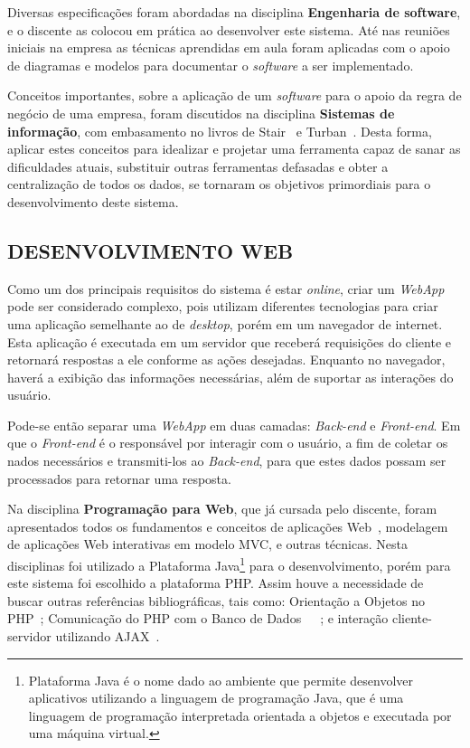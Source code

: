 \documentclass[
  12pt,				%
  openany,
  oneside,
  a4paper,			%
  english,			%
  brazil
]{article}
\numberwithin{figure}{section}
\numberwithin{table}{section}
\begin{document}
Diversas especificações foram abordadas na disciplina \textbf{Engenharia de software}, e o discente as colocou em prática ao desenvolver este sistema. Até nas reuniões iniciais na empresa as técnicas aprendidas em aula foram aplicadas com o apoio de diagramas e modelos para documentar o \textit{software} a ser implementado.

Conceitos importantes, sobre a aplicação de um \textit{software} para o apoio da regra de negócio de uma empresa, foram discutidos na disciplina \textbf{Sistemas de informação}, com embasamento no livros de Stair~\cite{SI_principios} e Turban~\cite{SI_turban}. Desta forma, aplicar estes conceitos para idealizar e projetar uma ferramenta capaz de sanar as dificuldades atuais, substituir outras ferramentas defasadas e obter a centralização de todos os dados, se tornaram os objetivos primordiais para o desenvolvimento deste sistema.

\subsection{DESENVOLVIMENTO WEB}
Como um dos principais requisitos do sistema é estar \textit{online}, criar um \textit{WebApp} pode ser considerado complexo, pois utilizam diferentes tecnologias para criar uma aplicação semelhante ao de \textit{desktop}, porém em um navegador de internet. Esta aplicação é executada em um servidor que receberá requisições do cliente e retornará respostas a ele conforme as ações desejadas. Enquanto no navegador, haverá a exibição das informações necessárias, além de suportar as interações do usuário. 

Pode-se então separar uma \textit{WebApp} em duas camadas: \textit{Back-end} e \textit{Front-end}. Em que o \textit{Front-end} é o responsável por interagir com o usuário, a fim de coletar os nados necessários e transmiti-los ao \textit{Back-end}, para que estes dados possam ser processados para retornar uma resposta.

Na disciplina \textbf{Programação para Web}, que já cursada pelo discente, foram apresentados todos os fundamentos e conceitos de aplicações Web~\cite{pWeb_sebesta}, modelagem de aplicações Web interativas em modelo MVC, e outras técnicas. Nesta disciplinas foi utilizado a Plataforma Java\footnote{Plataforma Java é o nome dado ao ambiente que permite desenvolver aplicativos utilizando a linguagem de programação Java, que é uma linguagem de programação interpretada orientada a objetos e executada por uma máquina virtual.} para o desenvolvimento, porém para este sistema foi escolhido a plataforma PHP. Assim houve a necessidade de buscar outras referências bibliográficas, tais como: Orientação a Objetos no PHP~\cite{PHP_Novatec_poo}; Comunicação do PHP com o Banco de Dados~\cite{PHP_Novatec_dev}~\cite{PHP_Novatec_appWeb}~\cite{PHP_mysql}; e interação cliente-servidor utilizando AJAX~\cite{PHP_Novatec_ajax}.
\end{document}

